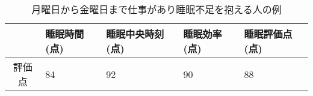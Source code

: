 \begin{table}[htbp]
	\begin{center}
	\begin{tabular}{|c|l|l|l|l|}
  	\hline
  	 & 睡眠時間(点) & 睡眠中央時刻(点) & 睡眠効率(点) & 睡眠評価点(点)\\
	\hline
	 評価点 & 84 & 92  & 90 & 88 \\
	 \hline
 	\end{tabular}
 	\end{center}
 	\caption{月曜日から金曜日まで仕事があり睡眠不足を抱える人の例}
 	\label{mctq_example}
\end{table}

\fi
